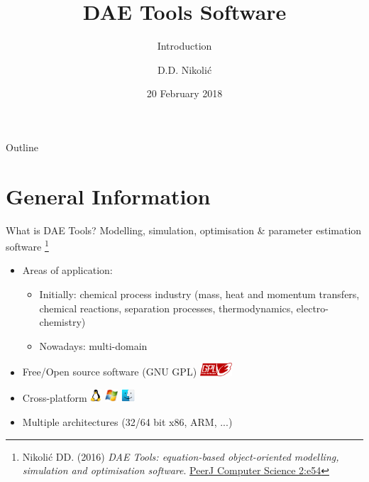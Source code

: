\documentclass[compress,newPxFont,sthlmFooter]{beamer}
\title{DAE Tools Software}
\subtitle{Introduction}
\author{D.D. Nikolić}
\institute
{
  DAE Tools Project, \url{http://www.daetools.com}
}
\date{20 February 2018}
\begin{document}
\maketitle

\begin{frame}{Outline}
\tableofcontents[sectionstyle=show, 
                 subsectionstyle=hide]
\end{frame} 

\section{General Information}

\begin{frame}{What is DAE Tools?} 
\alert{Modelling}, \alert{simulation}, \alert{optimisation} \& \alert{parameter estimation} software
\footnote{\tiny{Nikolić DD. (2016) \textit{DAE Tools: equation-based object-oriented modelling, simulation and optimisation software}.
          \href{https://doi.org/10.7717/peerj-cs.54}{PeerJ Computer Science 2:e54}}
         }

\begin{itemize}
  \item Areas of application:
    \begin{itemize}
      \item Initially: \alert{chemical process industry} (mass, heat and momentum transfers, chemical reactions, 
                                                          separation processes, thermodynamics, electro-chemistry)
      \item Nowadays: \alert{multi-domain}
    \end{itemize}
  \item \alert{Free/Open source software} (GNU GPL) \includegraphics[align=c,height=1.3em]{gnu_gpl3.png}
  \item \alert{Cross-platform} \includegraphics[align=c,height=1.3em]{linux.png} 
                               \includegraphics[align=c,height=1.3em]{windows.png} 
                               \includegraphics[align=c,height=1.3em]{macos.png}
  \item \alert{Multiple architectures} (32/64 bit x86, ARM, ...)
\end{itemize}
\end{frame}
\end{document}
